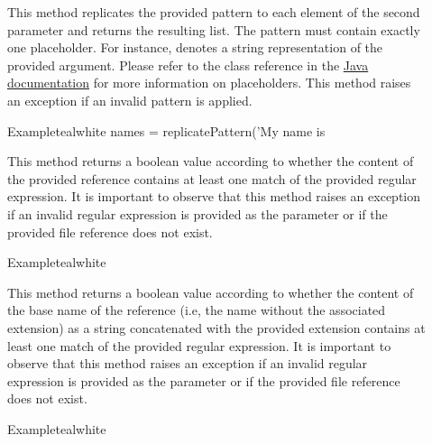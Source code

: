 \begin{description}
\item[] This method replicates the provided pattern to each element of the second parameter and returns the resulting list. The pattern must contain exactly one placeholder. For instance,  denotes a string representation of the provided argument. Please refer to the  class reference in the \href{https://docs.oracle.com/javase/7/docs/api/java/util/Formatter.html}{Java documentation} for more information on placeholders. This method raises an exception if an invalid pattern is applied.

\begin{codebox}{Example}{teal}{\icnote}{white}
names = replicatePattern('My name is %
\end{codebox}

\item[] This method returns a boolean value according to whether the content of the provided  reference contains at least one match of the provided  regular expression. It is important to observe that this method raises an exception if an invalid regular expression is provided as the parameter or if the provided file reference does not exist.

\begin{codebox}{Example}{teal}{\icnote}{white}
\end{codebox}

\item[] This method returns a boolean value according to whether the content of the base name of the  reference (i.e, the name without the associated extension) as a string concatenated with the provided  extension contains at least one match of the provided  regular expression. It is important to observe that this method raises an exception if an invalid regular expression is provided as the parameter or if the provided file reference does not exist.

\begin{codebox}{Example}{teal}{\icnote}{white}
\end{codebox}
\end{description}


